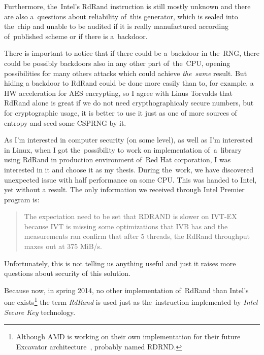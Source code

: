 \par{
Furthermore, the~Intel's RdRand instruction is still mostly unknown 
and there are also a~questions about reliability of~this generator, 
which is sealed into the~chip and unable to be audited\cite{TheodoreTsoNSA} 
if it is really manufactured according of~published 
scheme\cite{AnalysisOfDRNG} or if there is a~backdoor. 
}

\par{
There is important to notice that if there could be a~backdoor in the~RNG, 
there could be possibly backdoors also in any other part of~the~CPU, opening 
possibilities for many others attacks which could achieve {\em the~same} result. 
But hiding a backdoor to RdRand could be done more easily than to, 
for example, a HW acceleration for AES encrypting, so I agree with Linus 
Torvalds that RdRand alone is great if we do not need crypthographicaly secure 
numbers, but for cryptographic usage, it is better to use it just as one of more 
sources of entropy and seed some CSPRNG by it.
}

\par{
As I'm interested in computer security (on some level), 
as well as I'm interested in Linux, 
when I got the~possibility to work on implementation of~a~library using RdRand
in production environment of~Red Hat corporation, 
I was interested in it and choose it as my thesis. 
During the~work, we have discovered unexpected issue with half performance 
on some CPU. This was handed to Intel, yet without a result. 
The only information we received through Intel Premier program is:
\begin{quote}
The expectation need to be set that RDRAND is slower on IVT-EX 
because IVT is missing some optimizations that IVB has 
and the measurements ran confirm that after 5 threads, 
the RdRand throughput maxes out at 375 MiB/s.
\end{quote}
Unfortunately, this is not telling us anything useful and just it raises more 
questions about security of this solution.
}
\par{
Because now, in spring 2014, no other implementation of~RdRand than Intel's 
one exists\footnote{Although AMD is working on their own implementation 
for their future Excavator architecture~\cite{AMDRdRand}, probably named 
RDRND.}
the term {\em RdRand} is used just as the~instruction implemented 
by {\em Intel Secure Key} technology.
}


